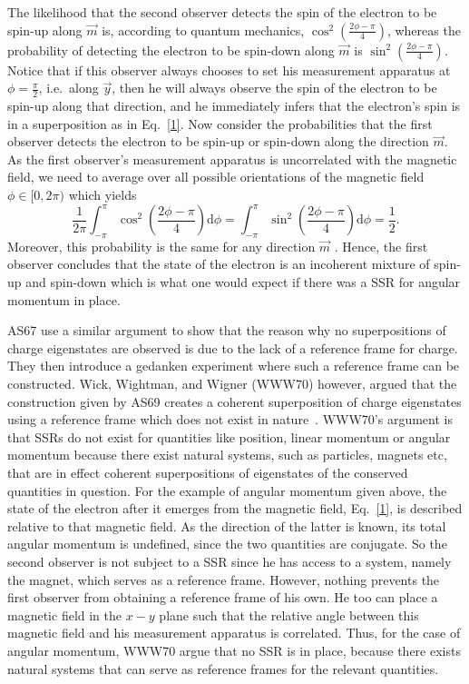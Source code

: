The likelihood that the second observer detects the spin of the electron to be spin-up along $\vec{m}$ is, according to quantum mechanics, $\cos^2\left(\frac{2\phi-\pi}{4}\right)$, whereas the probability of detecting the electron to be spin-down along $\vec{m}$ is $\sin^2\left(\frac{2\phi-\pi}{4}\right)$. Notice that if this observer always chooses to set his measurement apparatus at $\phi=\frac{\pi}{2}$, i.e.~along $\vec{y}$, then he will always observe the spin of the electron to be spin-up along that direction, and he immediately infers that the electron's spin is in a superposition as in Eq.~\eqref{1}. Now consider the probabilities that the first observer detects the electron to be spin-up or spin-down along the direction $\vec{m}$.  As the first observer's measurement apparatus is uncorrelated with the magnetic field, we need to average over all possible orientations of the magnetic field $\phi\in[0,2\pi)$ which yields   
\begin{equation}
\frac{1}{2\pi}\int_{-\pi}^{\pi} \cos^2\left(\frac{2\phi-\pi}{4}\right)\mathrm{d}\phi=\int_{-\pi}^{\pi} \sin^2\left(\frac{2\phi-\pi}{4}\right)\mathrm{d}\phi=\frac{1}{2}.
\label{2}
\end{equation}
Moreover, this probability is the same for any direction $\vec{m}$ .  Hence, the first observer  concludes that the state of the electron is an incoherent mixture of spin-up and spin-down which is what one would expect if there was a SSR for angular momentum in place.   

AS67 use a similar argument to show that the reason why no superpositions of charge eigenstates are observed is due to the lack of a reference frame for charge.  They then introduce a gedanken experiment where such a reference frame can be constructed. Wick, Wightman, and Wigner (WWW70) however, argued that the construction given by AS69 creates a coherent superposition of charge eigenstates using a reference frame which does not exist in nature~\cite{WWW70}.  WWW70's argument is that SSRs do not exist for quantities like position, linear momentum or angular momentum because there exist natural systems, such as particles, magnets etc, that are in effect coherent superpositions of eigenstates of the conserved quantities in question. For the example of angular momentum given above, the state of the electron after it emerges from the magnetic field, Eq.~\eqref{1}, is described relative to that magnetic field. As the direction of the latter is known, its total angular momentum is undefined, since the two quantities are conjugate. So the second observer is not subject to a SSR since he has access to a system, namely the magnet, which serves as a reference frame. However, nothing prevents the first observer from obtaining a reference frame of his own. He too can place a magnetic field in the $x-y$ plane such that the relative angle between this magnetic field and his measurement apparatus is correlated. Thus, for the case of angular momentum, WWW70 argue that no  SSR is in place, because there exists natural systems that can serve as reference frames for the relevant quantities.  


